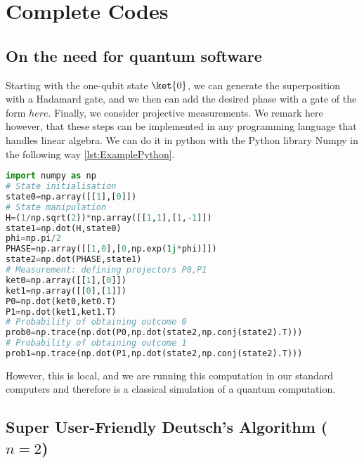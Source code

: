 \chapter{Complete Codes}
\label{chpt:fullcodeexamples}

\lstlistoflistings

\section{On the need for quantum software}

Starting with the one-qubit state $\ket{0}$, we can generate the superposition with a Hadamard gate, and we then can add the desired phase with a gate of the form $here$. Finally, we consider projective measurements. We remark here however, that these steps can be implemented in any programming language that handles linear algebra.  We can do it in python with the Python library Numpy in the following way \autoref{lst:ExamplePython}.

\begin{lstlisting}[language=Python,caption={Example with python only},label={lst:ExamplePython},frame=single] 
import numpy as np
# State initialisation
state0=np.array([[1],[0]])
# State manipulation
H=(1/np.sqrt(2))*np.array([[1,1],[1,-1]])
state1=np.dot(H,state0)
phi=np.pi/2
PHASE=np.array([[1,0],[0,np.exp(1j*phi)]])
state2=np.dot(PHASE,state1)
# Measurement: defining projectors P0,P1
ket0=np.array([[1],[0]])
ket1=np.array([[0],[1]])
P0=np.dot(ket0,ket0.T)
P1=np.dot(ket1,ket1.T)
# Probability of obtaining outcome 0
prob0=np.trace(np.dot(P0,np.dot(state2,np.conj(state2).T)))
# Probability of obtaining outcome 1
prob1=np.trace(np.dot(P1,np.dot(state2,np.conj(state2).T)))
\end{lstlisting}
However, this is local, and we are running this computation in our standard computers and therefore is a classical simulation of a quantum computation.

\newpage
\section{Super User-Friendly Deutsch's Algorithm ($n=2$)}

